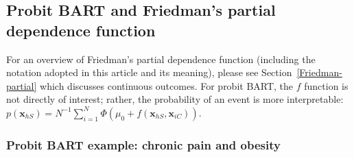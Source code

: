 \documentclass[article]{jss}
\begin{document}
\subsection{Probit BART and Friedman's partial dependence function}

For an overview of Friedman's partial dependence function (including
the notation adopted in this article and its meaning), please see 
Section~\ref{Friedman-partial} which discusses continuous outcomes.
For probit BART, the $f$ function is not directly of interest; rather,
the probability of an event is more interpretable:
$p(\bm{x}_{hS}) = {N^{-1}} \sum_{i=1}^N
\Phi(\mu_0+f(\bm{x}_{hS},\bm{x}_{iC}))$.  

\subsubsection{Probit BART example: chronic pain and obesity}
\label{nhanes}
\end{document}
